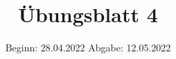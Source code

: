 

\title{Übungsblatt 4}
\date{%
  Beginn: 28.04.2022
  \hspace{3em}
  Abgabe: 12.05.2022
}



\maketitle
\thispagestyle{empty}
\tableofcontents
\newpage





